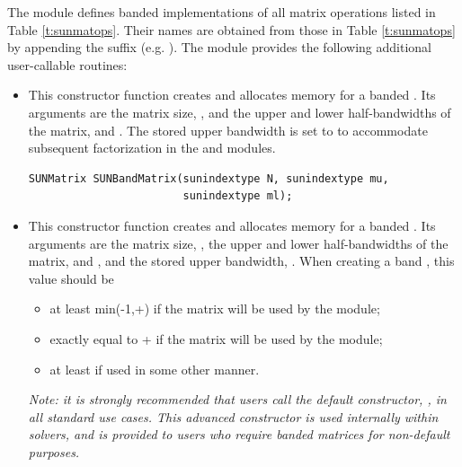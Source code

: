 The {\sunmatband} module defines banded implementations of all matrix
operations listed in Table \ref{t:sunmatops}. Their names are obtained
from those in Table \ref{t:sunmatops} by appending the
suffix  (e.g. ).
The module {\sunmatband} provides the following additional user-callable routines:
\begin{itemize}


\item {}

  This constructor function creates and allocates memory for a banded .
  Its arguments are the matrix size, , and the upper and lower
  half-bandwidths of the matrix,  and .  The stored
  upper bandwidth is set to  to accommodate subsequent
  factorization in the {\sunlinsolband} and {\sunlinsollapband} modules.

  \begin{verbatim}
SUNMatrix SUNBandMatrix(sunindextype N, sunindextype mu,
                        sunindextype ml);
  \end{verbatim}


\item {}

  This constructor function creates and allocates memory for a banded .
  Its arguments are the matrix size, , the upper and lower
  half-bandwidths of the matrix,  and , and the stored
  upper bandwidth, .  When creating a band ,
  this value should be
  \begin{itemize}
  \item at least min(-1,+) if the matrix will be
    used by the {\sunlinsolband} module;
  \item exactly equal to + if the matrix will be used by
    the {\sunlinsollapband} module;
  \item at least  if used in some other manner.
  \end{itemize}
  \emph{Note: it is strongly recommended that users call the default
    constructor, , in all standard use cases.  This
    advanced constructor is used internally within {\sundials}
    solvers, and is provided to users who require banded matrices for
    non-default purposes.}


\end{itemize}
